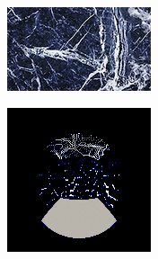 \begin{figure}[]
\begin{subfigure}{\textwidth}
        \begin{subfigure}{0.19\textwidth}
            \centering
            \includegraphics[width=\textwidth]{images/04-experiment03/ball_marble_target.jpg}
            \caption*{}
        \end{subfigure}
        \hfill
        \begin{subfigure}{0.19\textwidth}
            \centering
            \includegraphics[width=\textwidth]{images/04-experiment03/ball/marble/stats_im.jpg}
            \caption*{}
        \end{subfigure}
        \hfill
        \begin{subfigure}{0.19\textwidth}

\end{subfigure}
\end{subfigure}
\end{figure}
